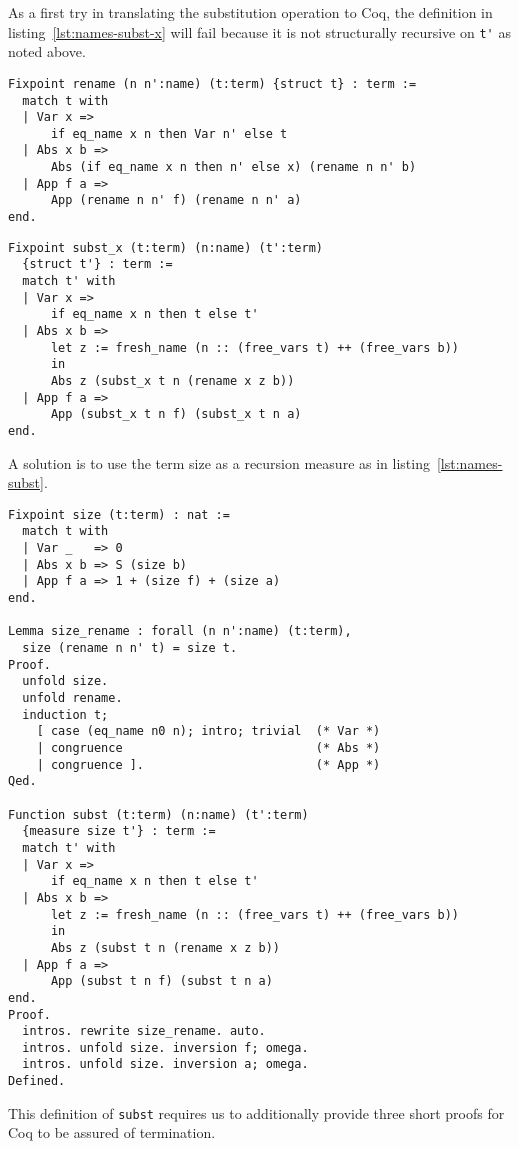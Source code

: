 \documentclass[a4paper,11pt]{article}
\begin{document}
As a first try in translating the substitution operation to Coq, the
definition in listing~\ref{lst:names-subst-x} will fail because it
is not structurally recursive on \lstinline{t'} as noted above.
\begin{lstlisting}[float,caption={{\small \em (Named variables)} Renaming},label=lst:names-rename]
Fixpoint rename (n n':name) (t:term) {struct t} : term :=
  match t with
  | Var x =>
      if eq_name x n then Var n' else t
  | Abs x b =>
      Abs (if eq_name x n then n' else x) (rename n n' b)
  | App f a =>
      App (rename n n' f) (rename n n' a)
end.
\end{lstlisting}
\begin{lstlisting}[float,caption={{\small \em (Named variables)} Ill-formed capture-avoiding substitution},label=lst:names-subst-x]
Fixpoint subst_x (t:term) (n:name) (t':term)
  {struct t'} : term :=
  match t' with
  | Var x =>
      if eq_name x n then t else t'
  | Abs x b =>
      let z := fresh_name (n :: (free_vars t) ++ (free_vars b))
      in
      Abs z (subst_x t n (rename x z b))
  | App f a =>
      App (subst_x t n f) (subst_x t n a)
end.
\end{lstlisting}
A solution is to use the term size as a recursion measure as in
listing~\ref{lst:names-subst}.
\begin{lstlisting}[float,caption={{\small \em (Named variables)} Capture-avoiding substitution, recursion on size},label=lst:names-subst]
Fixpoint size (t:term) : nat :=
  match t with
  | Var _   => 0
  | Abs x b => S (size b)
  | App f a => 1 + (size f) + (size a)
end.

Lemma size_rename : forall (n n':name) (t:term),
  size (rename n n' t) = size t.
Proof.
  unfold size.
  unfold rename.
  induction t;
    [ case (eq_name n0 n); intro; trivial  (* Var *)
    | congruence                           (* Abs *)
    | congruence ].                        (* App *)
Qed.

Function subst (t:term) (n:name) (t':term)
  {measure size t'} : term :=
  match t' with
  | Var x =>
      if eq_name x n then t else t'
  | Abs x b =>
      let z := fresh_name (n :: (free_vars t) ++ (free_vars b))
      in
      Abs z (subst t n (rename x z b))
  | App f a =>
      App (subst t n f) (subst t n a)
end.
Proof.
  intros. rewrite size_rename. auto.
  intros. unfold size. inversion f; omega.
  intros. unfold size. inversion a; omega.
Defined.
\end{lstlisting}
This definition of \lstinline{subst} requires us to additionally provide
three short proofs for Coq to be assured of termination.
\end{document}
